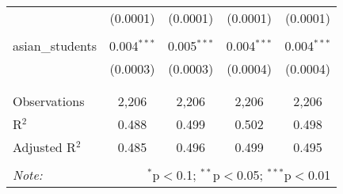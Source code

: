 \begin{table}[!htbp]
\begin{tabular}{@{\extracolsep{-2pt}}lcccc}
  & (0.0001) & (0.0001) & (0.0001) & (0.0001) \\ 
  & & & & \\ 
 asian\_students & 0.004$^{***}$ & 0.005$^{***}$ & 0.004$^{***}$ & 0.004$^{***}$ \\ 
  & (0.0003) & (0.0003) & (0.0004) & (0.0004) \\ 
  & & & & \\ 
\hline \\[-1.8ex] 
Observations & 2,206 & 2,206 & 2,206 & 2,206 \\ 
R$^{2}$ & 0.488 & 0.499 & 0.502 & 0.498 \\ 
Adjusted R$^{2}$ & 0.485 & 0.496 & 0.499 & 0.495 \\ 
\hline 
\hline \\[-1.8ex] 
\textit{Note:}  & \multicolumn{4}{r}{$^{*}$p$<$0.1; $^{**}$p$<$0.05; $^{***}$p$<$0.01} \\ 
\end{tabular} 
\end{table} 
